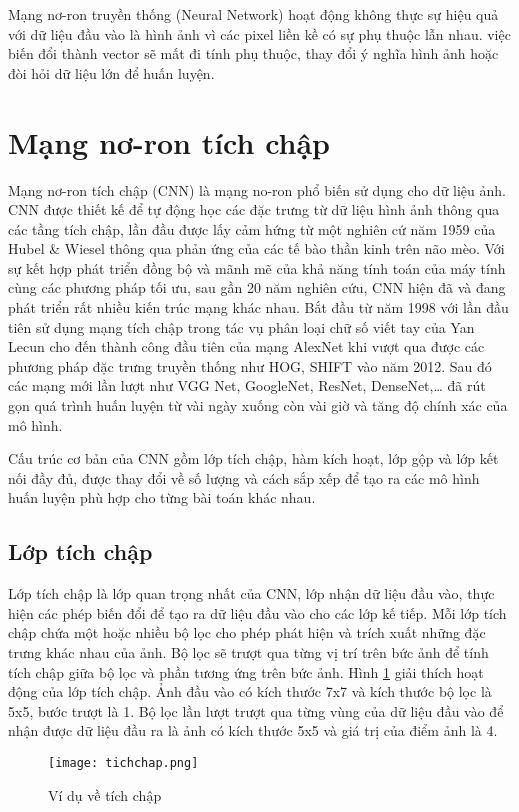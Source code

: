 \documentclass[../the.tex]{subfiles}
\begin{document}
{Mạng nơ-ron truyền thống (Neural Network) hoạt động không thực sự hiệu quả với dữ liệu đầu vào là hình ảnh vì các pixel liền kề có sự phụ thuộc lẫn nhau.
việc biến đổi thành vector sẽ mất đi tính phụ thuộc, thay đổi ý nghĩa hình ảnh hoặc đòi hỏi dữ liệu lớn để huấn luyện.

}

\section{Mạng nơ-ron tích chập }
\label{sec:cnn}
{\fontsize{13}{12} \selectfont
	Mạng nơ-ron tích chập (CNN) là mạng no-ron phổ biến sử dụng cho dữ liệu ảnh.
	CNN được thiết kế để tự động học các đặc trưng từ dữ liệu hình ảnh thông qua các tầng tích chập, lần đầu được lấy cảm hứng từ một nghiên cứ năm 1959 của Hubel \& Wiesel \cite{hubel1962receptive} thông qua phản ứng của các tế bào thần kinh trên não mèo. Với sự kết hợp phát triển đồng bộ và mãnh mẽ của khả năng tính toán của máy tính cùng các phương pháp tối ưu,
	sau gần 20 năm nghiên cứu, CNN hiện đã và đang phát triển rất nhiều kiến trúc mạng khác nhau. Bắt đầu từ năm 1998 với lần đầu tiên sử dụng mạng tích chập trong tác vụ phân loại chữ số viết tay của Yan Lecun
	\cite{lecun1998gradient} cho đến thành công đầu tiên của mạng AlexNet khi vượt qua được các phương pháp đặc trưng truyền thống như HOG, SHIFT vào năm 2012. Sau đó các mạng mới lần lượt như VGG Net, GoogleNet, ResNet, DenseNet,\dots
	đã rút gọn quá trình huấn luyện từ vài ngày xuống còn vài giờ và tăng độ chính xác của mô hình.

	Cấu trúc cơ bản của CNN gồm lớp tích chập, hàm kích hoạt, lớp gộp và lớp kết nối đầy đủ, được thay đổi về số lượng và cách sắp xếp để tạo ra các mô hình huấn luyện phù hợp cho từng bài toán khác nhau.
}

\subsection{Lớp tích chập}
{\fontsize{13}{12} \selectfont
	Lớp tích chập là lớp quan trọng nhất của CNN, lớp nhận dữ liệu đầu vào, thực hiện các phép biến đổi để tạo ra dữ liệu đầu vào cho các lớp kế tiếp. Mỗi lớp tích chập chứa một hoặc nhiều bộ lọc cho phép phát hiện và trích xuất những đặc trưng khác nhau của ảnh.
	Bộ lọc sẽ trượt qua từng vị trí trên bức ảnh để tính tích chập giữa bộ lọc và phần tương ứng trên bức ảnh.
	Hình \ref{fig:hinh_tichchap} giải thích hoạt động của lớp tích chập. Ảnh đầu vào có kích thước 7x7 và kích thước bộ lọc là 5x5, bước trượt là 1. Bộ lọc lần lượt trượt qua từng vùng của dữ liệu đầu vào để nhận được
	dữ liệu đầu ra là ảnh có kích thước 5x5 và giá trị của điểm ảnh là 4.
}
\begin{figure}[H]
	\centering
	\texttt{[image: tichchap.png]}
	\caption{Ví dụ về tích chập}
	\label{fig:hinh_tichchap}
\end{figure}
\end{document}
